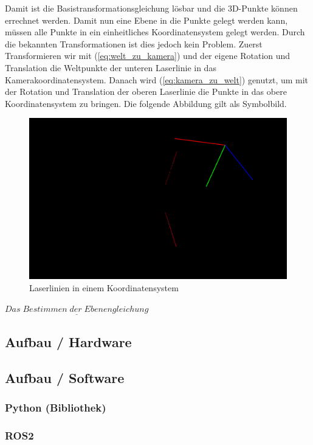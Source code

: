 		Damit ist die Basistransformationsgleichung lösbar und die 3D-Punkte können errechnet werden. Damit nun eine Ebene in die Punkte gelegt werden kann, müssen alle Punkte in ein einheitliches Koordinatensystem gelegt werden. Durch die bekannten Transformationen ist dies jedoch kein Problem. Zuerst Transformieren wir mit (\ref{eq:welt_zu_kamera}) und der eigene Rotation und Translation die Weltpunkte der unteren Laserlinie in das Kamerakoordinatensystem. Danach wird (\ref{eq:kamera_zu_welt}) genutzt, um mit der Rotation und Translation der oberen Laserlinie die Punkte in das obere Koordinatensystem zu bringen. Die folgende Abbildung gilt als Symbolbild.
	
		\begin{figure}[h]
			\centering
			\includegraphics[width=0.85\linewidth]{img/hauptteil/ext-calib/laserline_together.png}
			\caption{Laserlinien in einem Koordinatensystem}
			\label{fig:ext-calib-laserlines-together}
		\end{figure}
	
		$\underline{Das \; Bestimmen \; der \; Ebenengleichung}$
		
			\label{chap:kalibrierung_extrinsisch}
		
	\subsection{Aufbau / Hardware}
		\label{chap:aufbau_hardware}
	
	\subsection{Aufbau / Software}
		\subsubsection{Python (Bibliothek)}
		\subsubsection{ROS2}
		
